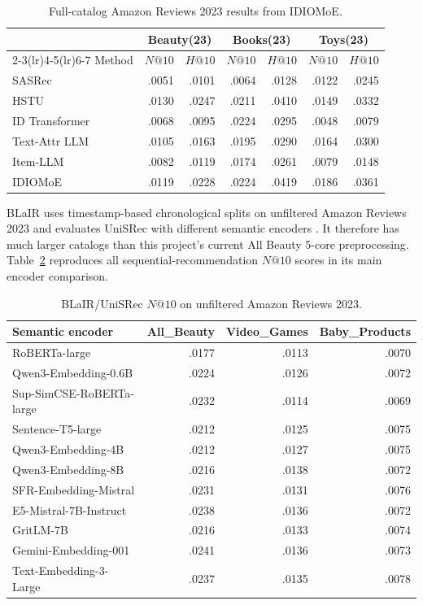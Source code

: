\begin{table}[H]
\centering
\caption{Full-catalog Amazon Reviews 2023 results from IDIOMoE.}
\label{tab:idiomoe-amazon23}
\footnotesize
\begin{tabular}{@{}lrrrrrr@{}}
\toprule
& \multicolumn{2}{c}{Beauty(23)} & \multicolumn{2}{c}{Books(23)}
& \multicolumn{2}{c}{Toys(23)} \\
\cmidrule(lr){2-3}\cmidrule(lr){4-5}\cmidrule(lr){6-7}
Method & $N@10$ & $H@10$ & $N@10$ & $H@10$ & $N@10$ & $H@10$ \\
\midrule
SASRec & .0051 & .0101 & .0064 & .0128 & .0122 & .0245 \\
HSTU & .0130 & .0247 & .0211 & .0410 & .0149 & .0332 \\
ID Transformer & .0068 & .0095 & .0224 & .0295 & .0048 & .0079 \\
Text-Attr LLM & .0105 & .0163 & .0195 & .0290 & .0164 & .0300 \\
Item-LLM & .0082 & .0119 & .0174 & .0261 & .0079 & .0148 \\
IDIOMoE & .0119 & .0228 & .0224 & .0419 & .0186 & .0361 \\
\bottomrule
\end{tabular}
\end{table}

BLaIR uses timestamp-based chronological splits on unfiltered Amazon Reviews
2023 and evaluates UniSRec with different semantic encoders \cite{BLAIR}. It
therefore has much larger catalogs than this project's current All Beauty
5-core preprocessing. Table~\ref{tab:blair-amazon23} reproduces all
sequential-recommendation $N@10$ scores in its main encoder comparison.

\begin{table}[H]
\centering
\caption{BLaIR/UniSRec $N@10$ on unfiltered Amazon Reviews 2023.}
\label{tab:blair-amazon23}
\footnotesize
\begin{tabular}{@{}lrrr@{}}
\toprule
Semantic encoder & All\_Beauty & Video\_Games & Baby\_Products \\
\midrule
RoBERTa-large & .0177 & .0113 & .0070 \\
Qwen3-Embedding-0.6B & .0224 & .0126 & .0072 \\
Sup-SimCSE-RoBERTa-large & .0232 & .0114 & .0069 \\
Sentence-T5-large & .0212 & .0125 & .0075 \\
Qwen3-Embedding-4B & .0212 & .0127 & .0075 \\
Qwen3-Embedding-8B & .0216 & .0138 & .0072 \\
SFR-Embedding-Mistral & .0231 & .0131 & .0076 \\
E5-Mistral-7B-Instruct & .0238 & .0136 & .0072 \\
GritLM-7B & .0216 & .0133 & .0074 \\
Gemini-Embedding-001 & .0241 & .0136 & .0073 \\
Text-Embedding-3-Large & .0237 & .0135 & .0078 \\
\bottomrule
\end{tabular}
\end{table}

